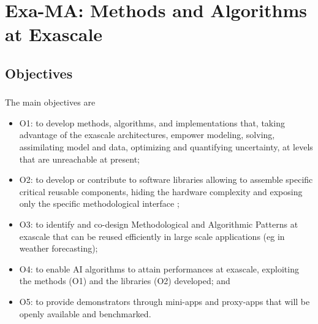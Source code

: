 \titleframe



\section{Exa-MA: Methods and Algorithms at Exascale}

\subsection{Objectives}

\begin{frame}
  \frametitle{\insertsectionhead}
  \framesubtitle{\insertsubsectionhead}
\footnotesize
The   main objectives are
\begin{itemize}
  \item O1: to develop methods, algorithms, and implementations that, taking advantage of the exascale architectures, empower modeling, solving, assimilating model and data, optimizing and quantifying uncertainty, at levels that are unreachable at present; 
  \item O2: to develop or contribute to software libraries allowing to assemble specific critical reusable components, hiding the hardware complexity and exposing only the specific methodological interface ;
  \item O3: to identify and co-design Methodological and Algorithmic Patterns at exascale that can be reused efficiently in large scale applications (eg in weather forecasting); 
  \item O4: to enable AI algorithms to attain performances at exascale, exploiting the methods (O1) and the libraries (O2) developed; and
  \item O5: to provide demonstrators through mini-apps and proxy-apps that will be openly available and benchmarked.
\end{itemize}


\end{frame}

